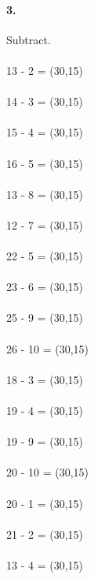 \documentclass[12pt]{article}
\begin{document}
\paragraph{3.}
Subtract. \\
\\
13 - 2 = \framebox(30,15){}
\\
\\
14 - 3 = \framebox(30,15){}
\\
\\
15 - 4 = \framebox(30,15){}
\\
\\
16 - 5 = \framebox(30,15){}
\\
\\
13 - 8 = \framebox(30,15){}
\\
\\
12 - 7 = \framebox(30,15){}
\\
\\
22 - 5 = \framebox(30,15){}
\\
\\
23 - 6 = \framebox(30,15){}
\\
\\
25 - 9 = \framebox(30,15){}
\\
\\
26 - 10 = \framebox(30,15){}
\\
\\
18 - 3 = \framebox(30,15){}
\\
\\
19 - 4 = \framebox(30,15){}
\\
\\
19 - 9 = \framebox(30,15){}
\\
\\
20 - 10 = \framebox(30,15){}
\\
\\
20 - 1 = \framebox(30,15){}
\\
\\
21 - 2 = \framebox(30,15){}
\\
\\
13 - 4 = \framebox(30,15){}
\end{document}
